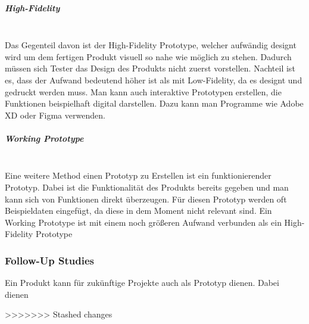 \documentclass{article}
\newcommand{\subparagraphlb}[1]{\subparagraph{#1}\mbox{}\\}
\begin{document}
	\subparagraphlb{High-Fidelity}
	Das Gegenteil davon ist der High-Fidelity Prototype, welcher aufwändig designt wird um dem fertigen Produkt visuell so nahe wie möglich zu stehen. Dadurch müssen sich Tester das Design des Produkts nicht zuerst vorstellen. Nachteil ist es, dass der Aufwand bedeutend höher ist als mit Low-Fidelity, da es designt und gedruckt werden muss. Man kann auch interaktive Prototypen erstellen, die Funktionen beispielhaft digital darstellen. Dazu kann man Programme wie Adobe XD oder Figma verwenden.
	\subparagraphlb{Working Prototype}
	Eine weitere Method einen Prototyp zu Erstellen ist ein funktionierender Prototyp. Dabei ist die Funktionalität des Produkts bereits gegeben und man kann sich von Funktionen direkt überzeugen. Für diesen Prototyp werden oft Beispieldaten eingefügt, da diese in dem Moment nicht relevant sind. Ein Working Prototype ist mit einem noch größeren Aufwand verbunden als ein High-Fidelity Prototype
	\subsubsection{Follow-Up Studies}
	Ein Produkt kann für zukünftige Projekte auch als Prototyp dienen. Dabei dienen 
	
>>>>>>> Stashed changes















  
\end{document}
